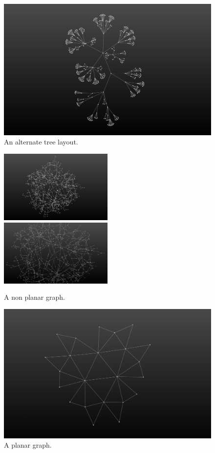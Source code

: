 \documentclass[11pt]{article}
\begin{document}
    \begin{figure}[H]
        \centering
        \includegraphics[width=\textwidth]{screen_shots/failed_tree.png}
        \caption{An alternate tree layout.}
    \end{figure}
    \begin{figure}[H]
        \centering
        \includegraphics[width=0.5\textwidth]{screen_shots/non_planar.png}
        \includegraphics[width=0.5\textwidth]{screen_shots/non_planar_zoomed.png}
        \caption{A non planar graph.}
    \end{figure}
    \begin{figure}[H]
        \centering
        \includegraphics[width=\textwidth]{screen_shots/planar.png}
        \caption{A planar graph.}
    \end{figure}
\end{document}
